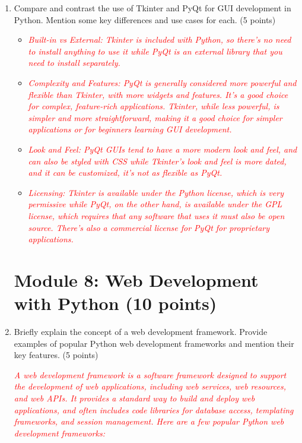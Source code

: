 \documentclass{article}
\begin{document}
\begin{enumerate}
         \item Compare and contrast the use of Tkinter and PyQt for GUI development
         in Python. Mention some key differences and use cases for each. (5 points) \par
         \begin{itemize}
            \item \textcolor{red}{\textit{Built-in vs External: Tkinter is included with Python, so there's no need to install anything to use it while 
            PyQt is an external library that you need to install separately.}}
            \item \textcolor{red}{\textit{Complexity and Features: PyQt is generally considered more powerful and flexible than Tkinter, with more widgets and features. 
            It's a good choice for complex, feature-rich applications. Tkinter, while less powerful, 
            is simpler and more straightforward, making it a good choice for simpler applications or for beginners learning GUI development.}}
            \item \textcolor{red}{\textit{Look and Feel: PyQt GUIs tend to have a more modern look and feel, and can also be styled with CSS while 
            Tkinter's look and feel is more dated, and it can be customized, it's not as flexible as PyQt.}}
            \item \textcolor{red}{\textit{Licensing: Tkinter is available under the Python license, which is very permissive while 
            PyQt, on the other hand, is available under the GPL license, which requires that any software that uses it must also be open source. 
            There's also a commercial license for PyQt for proprietary applications.}}
         \end{itemize}

         \section{Module 8: Web Development with Python (10
         points)}
            \item Briefly explain the concept of a web development framework. Provide
         examples of popular Python web development frameworks and mention
         their key features. (5 points)\par

            \textcolor{red}{\textit{A web development framework is a software framework designed to support the development of web applications, 
         including web services, web resources, and web APIs. It provides a standard way to build and deploy web applications, 
         and often includes code libraries for database access, templating frameworks, and session management.
         Here are a few popular Python web development frameworks:}}


\end{enumerate}
\end{document}
